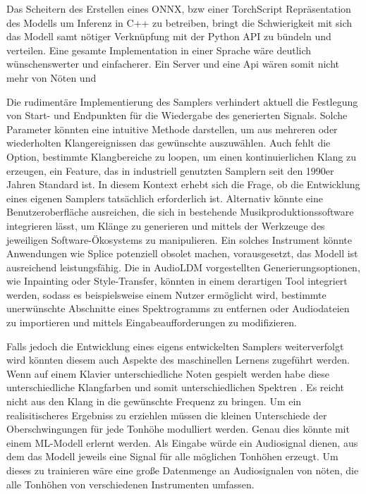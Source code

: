 \documentclass[
  a4paper,  %
  twoside,  %
  bibliography=totoc,
  headsepline,
  cleardoublepage=empty,
  parskip=half,
  draft=false
]{scrbook}
\begin{document}
Das Scheitern des Erstellen eines ONNX, bzw einer TorchScript Repräsentation des Modells um Inferenz in C++ zu betreiben, bringt die Schwierigkeit mit sich das Modell samt nötiger Verknüpfung mit der Python API zu bündeln und verteilen. Eine gesamte Implementation in einer Sprache wäre deutlich wünschenswerter und einfacherer. Ein Server und eine Api wären somit nicht mehr von Nöten und 

Die rudimentäre Implementierung des Samplers verhindert aktuell die Festlegung von Start- und Endpunkten für die Wiedergabe des generierten Signals. Solche Parameter könnten eine intuitive Methode darstellen, um aus mehreren oder wiederholten Klangereignissen das gewünschte auszuwählen. Auch fehlt die Option, bestimmte Klangbereiche zu loopen, um einen kontinuierlichen Klang zu erzeugen, ein Feature, das in industriell genutzten Samplern seit den 1990er Jahren Standard ist. In diesem Kontext erhebt sich die Frage, ob die Entwicklung eines eigenen Samplers tatsächlich erforderlich ist. Alternativ könnte eine Benutzeroberfläche ausreichen, die sich in bestehende Musikproduktionssoftware integrieren lässt, um Klänge zu generieren und mittels der Werkzeuge des jeweiligen Software-Ökosystems zu manipulieren. Ein solches Instrument könnte Anwendungen wie Splice potenziell obsolet machen, vorausgesetzt, das Modell ist ausreichend leistungsfähig. Die in AudioLDM vorgestellten Generierungsoptionen, wie Inpainting oder Style-Transfer, könnten in einem derartigen Tool integriert werden, sodass es beispielsweise einem Nutzer ermöglicht wird, bestimmte unerwünschte Abschnitte eines Spektrogramms zu entfernen oder Audiodateien zu importieren und mittels Eingabeaufforderungen zu modifizieren.

Falls jedoch die Entwicklung eines eigens entwickelten Samplers weiterverfolgt wird könnten diesem auch Aspekte des maschinellen Lernens zugeführt werden. Wenn auf einem Klavier unterschiedliche Noten gespielt werden habe diese unterschiedliche Klangfarben und somit unterschiedlichen Spektren \cite{parker_good_2009}. Es reicht nicht aus den Klang in die gewünschte Frequenz zu bringen. Um ein realisitischeres Ergebniss zu erziehlen müssen die kleinen Unterschiede der Oberschwingungen für jede Tonhöhe modulliert werden. Genau dies könnte mit einem ML-Modell erlernt werden. Als Eingabe würde ein Audiosignal dienen, aus dem das Modell jeweils eine Signal für alle möglichen Tonhöhen erzeugt. Um dieses zu trainieren wäre eine große Datenmenge an Audiosignalen von nöten, die alle Tonhöhen von verschiedenen Instrumenten umfassen. 
\end{document}
